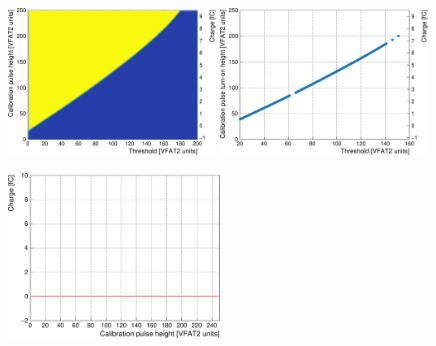      \begin{figure}[h!]
        \centering
        \includegraphics[width=0.49\textwidth]{img/plots/cSCurve_ThresholdVCal-crop}
        \includegraphics[width=0.49\textwidth]{img/plots/cSCurve_TurnOn-crop}
        \caption{}
        \label{fig:II-5-qualification-scurves}
      \end{figure}

      \begin{figure}[h!]
        \centering
        \includegraphics[width=0.5\textwidth]{img/plots/cCal_Charge-crop}
        \caption{}
        \label{fig:II-5-qualification-calcharge}
      \end{figure}

